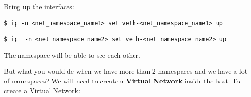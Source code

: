 \documentclass{article}
\newenvironment{codetemplate}[1][]{%
  \mybasecolorbox[#1]
  \itshape
}{%
  \endmybasecolorbox
}
\begin{document}
Bring up the interfaces:
\begin{codetemplate}{}
\begin{verbatim}
$ ip -n <net_namespace_name1> set veth-<net_namespace_name1> up
\end{verbatim}
\end{codetemplate}
\begin{codetemplate}{}
\begin{verbatim}
$ ip  -n <net_namespace_name2> set veth-<net_namespace_name2> up
\end{verbatim}
\end{codetemplate}

The namespace will be able to see each other.

But what you would de when we have more than 2 namespaces and we have a lot of namespaces? We will need to create a \textbf{Virtual Network} inside the host. To create a Virtual Network:
\end{document}
